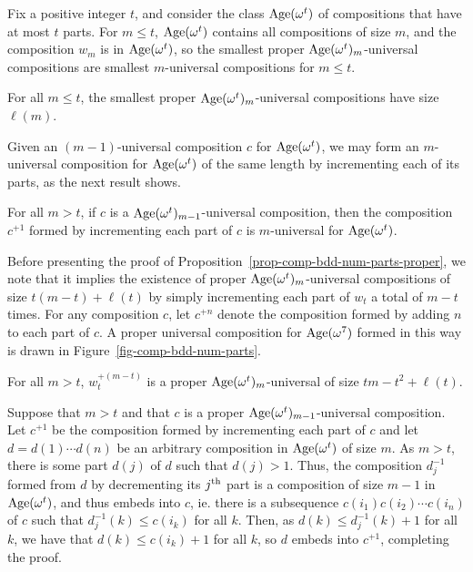 Fix a positive integer $t$, and consider the class $\operatorname{Age}(\omega^t)$ of compositions that have at most $t$ parts. For $m \le t$, $\operatorname{Age}(\omega^t)$ contains all compositions of size $m$, and the composition $w_m$ is in $\operatorname{Age}(\omega^t)$, so the smallest proper $\operatorname{Age}(\omega^t)_m$-universal compositions are smallest $m$-universal compositions for $m \le t$. 

\begin{proposition}
\label{thm-comp-bdd-num-parts-small}
	For all $m \le t$, the smallest proper $\operatorname{Age}(\omega^t)_m$-universal compositions have size $\ell(m)$. 
\end{proposition}

Given an $(m-1)$-universal composition $c$ for $\operatorname{Age}(\omega^t)$, we may form an $m$-universal composition for $\operatorname{Age}(\omega^t)$ of the same length by incrementing each of its parts, as the next result shows.
\begin{proposition}
\label{prop-comp-bdd-num-parts-proper}
	For all $m > t$, if $c$ is a $\operatorname{Age}(\omega^t)_{m-1}$-universal composition, then the composition $c^{+1}$ formed by incrementing each part of $c$ is $m$-universal for $\operatorname{Age}(\omega^t)$.
\end{proposition}
Before presenting the proof of Proposition~\ref{prop-comp-bdd-num-parts-proper}, we note that it implies the existence of proper $\operatorname{Age}(\omega^t)_m$-universal compositions of size $t(m-t) + \ell(t)$ by simply incrementing each part of $w_t$ a total of $m-t$ times. For any composition $c$, let $c^{+n}$ denote the composition formed by adding $n$ to each part of $c$. A proper universal composition for $\operatorname{Age}(\omega^7)$ formed in this way is drawn in Figure~\ref{fig-comp-bdd-num-parts}.
\begin{corollary}
	For all $m > t$, $w_t^{+(m-t)}$ is a proper $\operatorname{Age}(\omega^t)_m$-universal of size $tm - t^2 + \ell(t)$.
\label{cor-comp-bdd-num-parts-proper}
\end{corollary}
%
\newenvironment{proof-of-prop-comp-bdd-num-parts-proper}{%
	\medskip\noindent {\it Proof of Proposition~\ref{prop-comp-bdd-num-parts-proper}.\/}%
}{%
	\qed\bigskip%
}
\begin{proof-of-prop-comp-bdd-num-parts-proper}
	Suppose that $m > t$ and that $c$ is a proper $\operatorname{Age}(\omega^t)_{m-1}$-universal composition. Let $c^{+1}$ be the composition formed by incrementing each part of $c$ and let $d = d(1) \cdots d(n)$ be an arbitrary composition in $\operatorname{Age}(\omega^t)$ of size $m$. As $m > t$, there is some part $d(j)$ of $d$ such that $d(j) > 1$. Thus, the composition $d_{j}^{-1}$ formed from $d$ by decrementing its $j^{\mbox{\scriptsize th}}$ part is a composition of size $m-1$ in $\operatorname{Age}(\omega^t)$, and thus embeds into $c$, ie. there is a subsequence $c(i_1) c(i_2) \cdots c(i_n)$ of $c$ such that $d_{j}^{-1}(k) \le c(i_k)$ for all $k$. Then, as $d(k) \le d_{j}^{-1}(k) + 1$ for all $k$, we have that $d(k) \le c(i_k) + 1$ for all $k$, so $d$ embeds into $c^{+1}$, completing the proof.
\end{proof-of-prop-comp-bdd-num-parts-proper}

